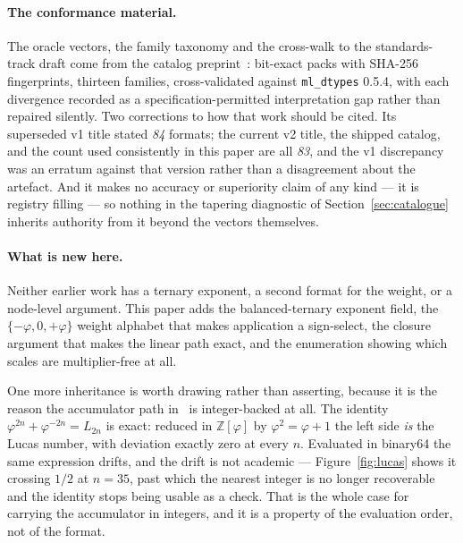 \paragraph{The conformance material.} The oracle vectors, the family taxonomy and
the cross-walk to the standards-track draft come from the catalog
preprint~\cite{catalogue}: bit-exact packs with SHA-256 fingerprints, thirteen
families, cross-validated against \texttt{ml\_dtypes} 0.5.4, with each divergence
recorded as a specification-permitted interpretation gap rather than repaired
silently. Two corrections to how that work should be cited. Its superseded v1
title stated \emph{84} formats; the current v2 title, the shipped catalog, and
the count used consistently in this paper are all \emph{83}, and the v1
discrepancy was an erratum against that version rather than a disagreement about
the artefact. And it makes
no accuracy or superiority claim of any kind --- it is registry filling --- so
nothing in the tapering diagnostic of Section~\ref{sec:catalogue} inherits
authority from it beyond the vectors themselves.

\paragraph{What is new here.} Neither earlier work has a ternary exponent, a
second format for the weight, or a node-level argument. This paper adds the
balanced-ternary exponent field, the $\{-\varphi,0,+\varphi\}$ weight alphabet
that makes application a sign-select, the closure argument that makes the linear
path exact, and the enumeration showing which scales are multiplier-free at all.

One more inheritance is worth drawing rather than asserting, because it is the
reason the accumulator path in~\cite{goldenfloat} is integer-backed at all.
The identity $\varphi^{2n}+\varphi^{-2n}=L_{2n}$ is exact: reduced in
$\mathbb{Z}[\varphi]$ by $\varphi^{2}=\varphi+1$ the left side \emph{is} the
Lucas number, with deviation exactly zero at every $n$. Evaluated in binary64 the
same expression drifts, and the drift is not academic ---
Figure~\ref{fig:lucas} shows it crossing $1/2$ at $n=35$, past which the nearest
integer is no longer recoverable and the identity stops being usable as a check.
That is the whole case for carrying the accumulator in integers, and it is a
property of the evaluation order, not of the format.


